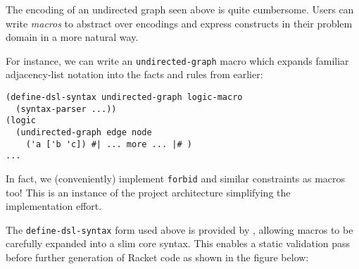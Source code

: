 \documentclass[dvipsnames,sigplan,screen,review,anonymous,acmthm,nonacm]{acmart}
\begin{document}
The encoding of an undirected graph seen above is quite cumbersome. Users can
write \emph{macros} to abstract over encodings and express constructs in their
problem domain in a more natural way.

For instance, we can write an \texttt{undirected-graph} macro
which expands familiar adjacency-list notation into the facts
and rules from earlier:

\begin{verbatim}
(define-dsl-syntax undirected-graph logic-macro
  (syntax-parser ...))
(logic
  (undirected-graph edge node
    ('a ['b 'c]) #| ... more ... |# )
...
\end{verbatim}

In fact, we (conveniently) implement \texttt{forbid} and similar constraints
as macros too!
This is an instance of the project architecture simplifying the implementation effort.

The \texttt{define-dsl-syntax} form used above is provided by \syntaxspec{},
allowing \miniDusa{} macros to be carefully expanded into a slim core syntax.
This enables a static validation pass before further generation of Racket code
as shown in the figure below:

\begin{figure}[h]
  \begin{center}
  \end{center}
\end{figure}
\end{document}
